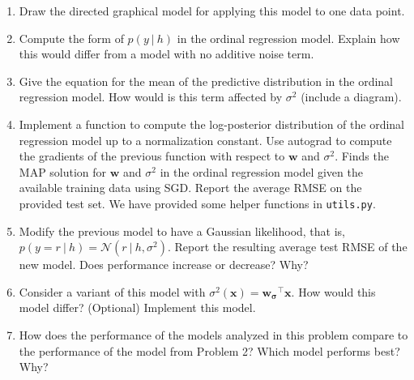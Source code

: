 \documentclass[submit]{harvardml}
\theoremstyle{plain}
\begin{document}
\begin{problem}
\begin{enumerate}
\vspace{-0.1cm}
~

\item Draw the directed graphical model for applying this model to one data point.

\item Compute the form of  $p(y\ |\ h)$ in the ordinal regression model. Explain
  how this would differ from a model with no additive noise term.

\vspace{-0.1cm}


\item Give the equation for the mean of the predictive distribution in the ordinal regression model.
How would is this term affected by $\sigma^2$ (include a diagram).

\vspace{-0.1cm}
\item Implement a function to compute the log-posterior distribution of the ordinal
regression model up to a normalization constant. Use autograd to compute
the gradients of the previous function with respect to $\mathbf{w}$ and
$\sigma^2$. Finds the MAP solution for $\mathbf{w}$ and
  $\sigma^2$ in the ordinal regression model given the available
  training data using SGD. Report the average RMSE on the provided test set. We have provided some helper
  functions in \texttt{utils.py}.



\vspace{-0.1cm}
\item Modify the previous model to have a Gaussian likelihood, that
  is, $p(y=r\ |\ h)=\mathcal{N}(r\ | \ h,\sigma^2)$. Report the resulting
  average test RMSE of the new model. Does performance increase or
  decrease? Why?  \vspace{-0.1cm}

\vspace{-0.1cm}
\item Consider a variant of this model with
  $\sigma^2(\mathbf{x}) = \mathbf{w_{\sigma}}^\top \mathbf{x}$. How would this
  model differ? (Optional) Implement this model.

\vspace{-0.1cm}
\item How does the performance of the models analyzed in this problem
  compare to the performance of the model from Problem 2? Which model
  performs best? Why?

\end{enumerate}
\end{problem}
\end{document}
